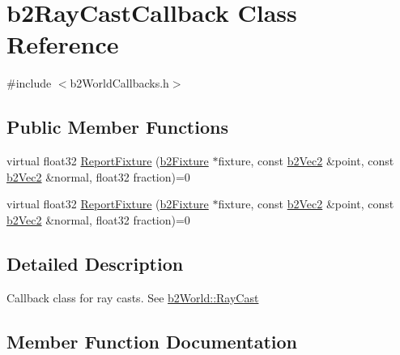 \hypertarget{classb2RayCastCallback}{}\section{b2\+Ray\+Cast\+Callback Class Reference}
\label{classb2RayCastCallback}


{\ttfamily \#include $<$b2\+World\+Callbacks.\+h$>$}

\subsection*{Public Member Functions}
\begin{DoxyCompactItemize}
\item 
virtual float32 \hyperlink{classb2RayCastCallback_a658d5c8e89e0c73230cc8bddade4f3a4}{Report\+Fixture} (\hyperlink{classb2Fixture}{b2\+Fixture} $\ast$fixture, const \hyperlink{structb2Vec2}{b2\+Vec2} \&point, const \hyperlink{structb2Vec2}{b2\+Vec2} \&normal, float32 fraction)=0
\item 
virtual float32 \hyperlink{classb2RayCastCallback_a658d5c8e89e0c73230cc8bddade4f3a4}{Report\+Fixture} (\hyperlink{classb2Fixture}{b2\+Fixture} $\ast$fixture, const \hyperlink{structb2Vec2}{b2\+Vec2} \&point, const \hyperlink{structb2Vec2}{b2\+Vec2} \&normal, float32 fraction)=0
\end{DoxyCompactItemize}


\subsection{Detailed Description}
Callback class for ray casts. See \hyperlink{classb2World_aa9955d94a254253997daaf16ce77bab6}{b2\+World\+::\+Ray\+Cast} 

\subsection{Member Function Documentation}
\mbox{\label{classb2RayCastCallback_a658d5c8e89e0c73230cc8bddade4f3a4}} 
